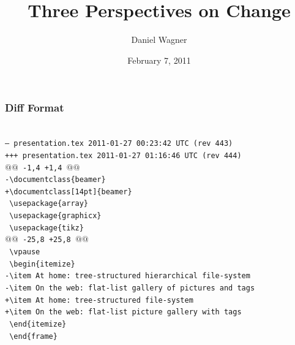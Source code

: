 \documentclass{beamer}
\begin{document}
\title{Three Perspectives on Change}
\author{Daniel Wagner}
\date{February 7, 2011}

\maketitle

\begin{frame}
    \frametitle{Diff Format}
    \tiny\texttt{
        \color{green!55!black} \\
        --- presentation.tex        2011-01-27 00:23:42 UTC (rev 443) \\
        +++ presentation.tex        2011-01-27 01:16:46 UTC (rev 444) \\[4ex]
        \color{yellow!80!black}
        $@@$ -1,4 +1,4 $@@$ \\
        \color{orange}
        -\textbackslash documentclass\{beamer\} \\
        \color{blue}
        +\textbackslash documentclass[14pt]\{beamer\} \\
        \color{gray}
        \ \textbackslash usepackage\{array\} \\
        \ \textbackslash usepackage\{graphicx\} \\
        \ \textbackslash usepackage\{tikz\} \\
        \color{yellow!80!black}
        $@@$ -25,8 +25,8 $@@$ \\
        \color{gray}
        \ \quad\textbackslash vpause \\[3ex]
        \ \quad\textbackslash begin\{itemize\} \\
        \color{orange}
        -\quad\quad\textbackslash item At home: tree-structured hierarchical file-system \\
        -\quad\quad\textbackslash item On the web: flat-list gallery of pictures and tags \\
        \color{blue}
        +\quad\quad\textbackslash item At home: tree-structured file-system \\
        +\quad\quad\textbackslash item On the web: flat-list picture gallery with tags \\
        \color{gray}
        \ \quad\textbackslash end\{itemize\} \\
        \ \textbackslash end\{frame\} \\
    }
\end{frame}
\end{document}
